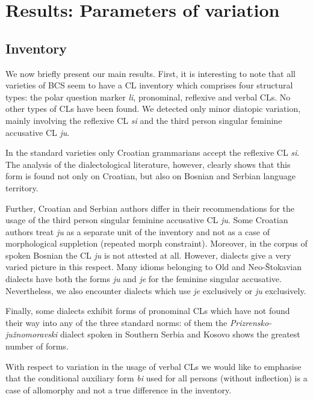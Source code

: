 \section{Results: Parameters of variation}

\subsection{Inventory}



We now briefly present our main results. First, it is interesting to note that all varieties of BCS seem to have a CL inventory which comprises four structural types: the polar question marker \textit{li}, pronominal, reflexive and verbal CLs. No other types of CLs have been found. We detected only minor diatopic variation, mainly involving the reflexive CL \textit{si} and the third person singular feminine accusative CL \textit{ju}. 

In the standard varieties only Croatian grammarians accept the reflexive CL \textit{si}. The analysis of the dialectological literature, however, clearly shows that this form is found not only on Croatian, but also on Bosnian and Serbian language territory. 

Further, Croatian and Serbian authors differ in their recommendations for the usage of the third person singular feminine accusative CL \textit{ju}. Some Croatian authors treat \textit{ju} as a separate unit of the inventory and not as a case of morphological suppletion (repeated morph constraint). Moreover, in the corpus of spoken Bosnian the CL \textit{ju} is not attested at all. However, dialects give a very varied picture in this respect. Many idioms belonging to Old and Neo-Štokavian dialects have both the forms \textit{ju} and \textit{je} for the feminine singular accusative. Nevertheless, we also encounter dialects which use \textit{je }exclusively or \textit{ju} exclusively. 

Finally, some dialects exhibit forms of pronominal CLs which have not found their way into any of the three standard norms: of them the \textit{Prizrensko-južno\-mo\-rav\-ski} dialect spoken in Southern Serbia and Kosovo shows the greatest number of forms. 

With respect to variation in the usage of verbal CLs we would like to emphasise that the conditional auxiliary form \textit{bi} used for all persons (without inflection) is a case of allomorphy and not a true difference in the inventory.  





